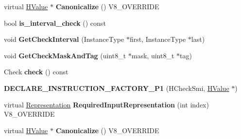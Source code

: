 \begin{DoxyCompactItemize}
\item 
\hypertarget{classv8_1_1internal_1_1_v8___f_i_n_a_l_aad5f871e0a6782c02e742ec017eca3cd}{}virtual \hyperlink{classv8_1_1internal_1_1_h_value}{H\+Value} $\ast$ {\bfseries Canonicalize} () V8\+\_\+\+O\+V\+E\+R\+R\+I\+D\+E\label{classv8_1_1internal_1_1_v8___f_i_n_a_l_aad5f871e0a6782c02e742ec017eca3cd}

\item 
\hypertarget{classv8_1_1internal_1_1_v8___f_i_n_a_l_a186d3924d703cbf667ab3d71259bb25e}{}bool {\bfseries is\+\_\+interval\+\_\+check} () const \label{classv8_1_1internal_1_1_v8___f_i_n_a_l_a186d3924d703cbf667ab3d71259bb25e}

\item 
\hypertarget{classv8_1_1internal_1_1_v8___f_i_n_a_l_a16c1cf227d7416563ed76e052e7be5f1}{}void {\bfseries Get\+Check\+Interval} (Instance\+Type $\ast$first, Instance\+Type $\ast$last)\label{classv8_1_1internal_1_1_v8___f_i_n_a_l_a16c1cf227d7416563ed76e052e7be5f1}

\item 
\hypertarget{classv8_1_1internal_1_1_v8___f_i_n_a_l_ad383116cef634db3e7456c15f11265cb}{}void {\bfseries Get\+Check\+Mask\+And\+Tag} (uint8\+\_\+t $\ast$mask, uint8\+\_\+t $\ast$tag)\label{classv8_1_1internal_1_1_v8___f_i_n_a_l_ad383116cef634db3e7456c15f11265cb}

\item 
\hypertarget{classv8_1_1internal_1_1_v8___f_i_n_a_l_a3fc080dfd343982cad52b39c629153f2}{}Check {\bfseries check} () const \label{classv8_1_1internal_1_1_v8___f_i_n_a_l_a3fc080dfd343982cad52b39c629153f2}

\item 
\hypertarget{classv8_1_1internal_1_1_v8___f_i_n_a_l_a4630297dc754ec1bbde9052622f781d8}{}{\bfseries D\+E\+C\+L\+A\+R\+E\+\_\+\+I\+N\+S\+T\+R\+U\+C\+T\+I\+O\+N\+\_\+\+F\+A\+C\+T\+O\+R\+Y\+\_\+\+P1} (H\+Check\+Smi, \hyperlink{classv8_1_1internal_1_1_h_value}{H\+Value} $\ast$)\label{classv8_1_1internal_1_1_v8___f_i_n_a_l_a4630297dc754ec1bbde9052622f781d8}

\item 
\hypertarget{classv8_1_1internal_1_1_v8___f_i_n_a_l_a6c6d1f37f40b113d8f4062f1ffff7215}{}virtual \hyperlink{classv8_1_1internal_1_1_representation}{Representation} {\bfseries Required\+Input\+Representation} (int index) V8\+\_\+\+O\+V\+E\+R\+R\+I\+D\+E\label{classv8_1_1internal_1_1_v8___f_i_n_a_l_a6c6d1f37f40b113d8f4062f1ffff7215}

\item 
\hypertarget{classv8_1_1internal_1_1_v8___f_i_n_a_l_aad5f871e0a6782c02e742ec017eca3cd}{}virtual \hyperlink{classv8_1_1internal_1_1_h_value}{H\+Value} $\ast$ {\bfseries Canonicalize} () V8\+\_\+\+O\+V\+E\+R\+R\+I\+D\+E\label{classv8_1_1internal_1_1_v8___f_i_n_a_l_aad5f871e0a6782c02e742ec017eca3cd}


\end{DoxyCompactItemize}

